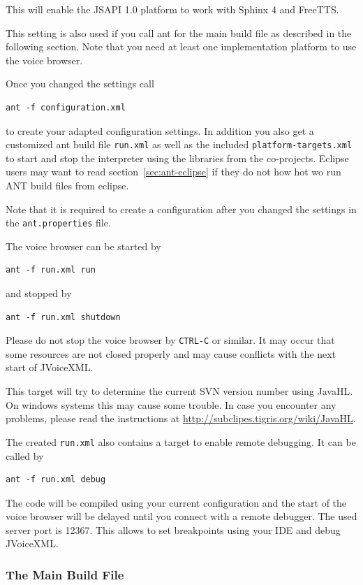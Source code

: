 \documentclass[11pt,a4paper]{article}
\begin{document}
This will enable the JSAPI 1.0 platform to work with Sphinx 4 and FreeTTS. 


This setting is also used if you call ant for the main build file as described
in the following section.
Note that you need at least one implementation platform to use the voice
browser.

Once you changed the settings call
\begin{lstlisting}
ant -f configuration.xml
\end{lstlisting}
to create your adapted configuration settings. In addition you also get
a customized ant build file \texttt{run.xml} as well as the included
\texttt{platform-targets.xml} to start and
stop the interpreter using the libraries from the co-projects.
Eclipse users may want to read section~\ref{sec:ant-eclipse} if they do
not how hot wo run ANT build files from eclipse. 

Note that it is required to create a configuration after you changed the
settings in the \texttt{ant.properties} file.

The voice browser can be started by
\begin{lstlisting}
ant -f run.xml run
\end{lstlisting}
and stopped by
\begin{lstlisting}
ant -f run.xml shutdown
\end{lstlisting}

Please do not stop the voice browser by \texttt{CTRL-C} or similar. It may occur
that some resources are not closed properly and may cause conflicts with the next
start of JVoiceXML.

This target will try to determine the current SVN version number using JavaHL. On
windows systems this may cause some trouble. In case you encounter any problems,
please read the instructions at \url{http://subclipes.tigris.org/wiki/JavaHL}.

The created \texttt{run.xml} also contains a target to enable remote
debugging. It can be called by
\begin{lstlisting}
ant -f run.xml debug
\end{lstlisting}
The code will be compiled using your current configuration and the start of the
voice browser will be delayed until you connect with a remote debugger. The
used server port is 12367. This allows to set breakpoints using your IDE and
debug JVoiceXML.

\subsubsection{The Main Build File}
\label{sec:ant-build-file}
\end{document}
